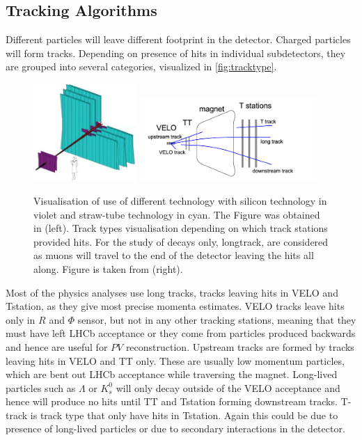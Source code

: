 \subsection{Tracking Algorithms}
Different particles will leave different footprint in the detector. Charged particles will form tracks. Depending on presence of hits in individual subdetectors, they are grouped into several categories, visualized in \autoref{fig:tracktype}.

\begin{figure}[!h]
	\centering
	\includegraphics[width = 0.35\textwidth]{figs/detector/trackingsystem.jpg}%
	\includegraphics[width = 0.6\textwidth]{figs/detector/tracktype.png}
	\caption{ Visualisation of use of different technology with silicon technology in violet and straw-tube technology in cyan. The Figure was obtained in \cite{OT}(left). Track types visualisation depending on which track stations provided hits. For the study of \Bmumumu decays only, \Gls{longtrack}, are considered as muons will travel to the end of the detector leaving the hits all along. Figure is taken from \cite{LHCb-DP-2013-002} (right).}
	\label{fig:tracktype}
\end{figure}


Most of the physics analyses use long tracks, tracks leaving hits in \Gls{VELO} and \Gls{Tstation}, as they give most precise momenta estimates.
VELO tracks leave hits only in $R$ and $\Phi$ sensor, but not in any other tracking stations, meaning that they must have left \Gls{LHCb} acceptance or they come from particles produced backwards and hence are useful for $PV$ reconstruction. Upstream tracks are formed by tracks leaving hits in \Gls{VELO} and TT only. These are usually low momentum particles, which are bent out \Gls{LHCb} acceptance while traversing the magnet. Long-lived particles such as $\Lambda$ or $K^{0}_{s}$ will only decay outside of the \Gls{VELO} acceptance and hence will produce no hits until \Gls{TT} and \Gls{Tstation} forming downstream tracks. T-track is track type that only have hits in \Gls{Tstation}. Again this could be due to presence of long-lived particles or due to secondary interactions in the detector.   

